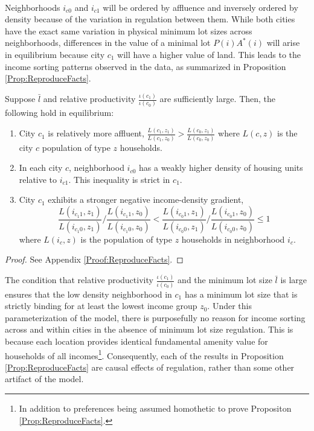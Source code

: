 \documentclass[11pt]{article}
\begin{document}
	\paragraph*{}
	 Neighborhoods $i_{c0}$ and $i_{c1}$ will be ordered by affluence and inversely ordered by density because of the variation in regulation between them. While both cities have the exact same variation in physical minimum lot sizes across neighborhoods, differences in the value of a minimal lot $P(i)A^{*}(i)$ will arise in equilibrium because city $c_{1}$ will have a higher value of land. This leads to the income sorting patterns observed in the data, as summarized in Proposition \ref{Prop:ReproduceFacts}.
	\begin{Proposition}\label{Prop:ReproduceFacts}
	Suppose $\bar{l}$ and relative productivity $\frac{\iota(c_{1})}{\iota(c_{0})}$ are sufficiently large. Then, the following hold in equilibrium:
	
		\begin{enumerate}
			\item City $c_{1}$ is relatively more affluent, $\frac{L(c_{1}, z_{1})}{L(c_{1}, z_{0})} > \frac{L(c_{0}, z_{1})}{L(c_{0}, z_{0})}$ where $L(c, z)$ is the city $c$ population of type $z$ households.
		
			\item In each city $c$, neighborhood $i_{c0}$ has a weakly higher density of housing units relative to $i_{c1}$. This inequality is strict in $c_{1}$. 
		
			\item City $c_{1}$ exhibits a stronger negative income-density gradient, $$\frac{L(i_{c_{1}1}, z_{1})}{L(i_{c_{1}0}, z_{1})}/\frac{L(i_{c_{1}1}, z_{0})}{L(i_{c_{1}0}, z_{0})} < \frac{L(i_{c_{0}1}, z_{1})}{L(i_{c_{0}0}, z_{1})}/\frac{L(i_{c_{0}1}, z_{0})}{L(i_{c_{0}0}, z_{0})} \leq 1$$ where $L(i_{c}, z)$ is the population of type $z$ households in neighborhood $i_{c}$. 
		\end{enumerate}
	
	\end{Proposition}
	\begin{proof}
		See Appendix \ref{Proof:ReproduceFacts}.
	\end{proof}
	\noindent The condition that relative productivity $\frac{\iota(c_{1})}{\iota(c_{0})} $ and the minimum lot size $\bar{l}$ is large ensures that the low density neighborhood in $c_{1}$ has a minimum lot size that is strictly binding for at least the lowest income group $z_{0}$. Under this parameterization of the model, there is purposefully no reason for income sorting across and within cities in the absence of minimum lot size regulation. This is because each location provides identical fundamental amenity value for households of all incomes\footnote{In addition to preferences being assumed homothetic to prove Propositon \ref{Prop:ReproduceFacts}.}. Consequently, each of the results in Proposition \ref{Prop:ReproduceFacts} are causal effects of regulation, rather than some other artifact of the model.
	
\end{document}
